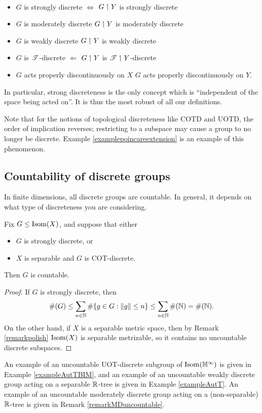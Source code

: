 \begin{observation}~
\label{observationrestrictions}
\begin{itemize}
\item[(i)] $G$ is strongly discrete $\Leftrightarrow$ $G\upharpoonleft Y$ is strongly discrete
\item[(ii)] $G$ is moderately discrete \implies $G\upharpoonleft Y$ is moderately discrete
\item[(iii)] $G$ is weakly discrete \implies $G\upharpoonleft Y$ is weakly discrete
\item[(iv)] $G$ is $\mathscr T$-discrete $\Leftarrow$ $G\upharpoonleft Y$ is $\mathscr T\upharpoonleft Y$-discrete
\item[(v)] $G$ acts properly discontinuously on $X$ \implies $G$ acts properly discontinuously on $Y$.
\end{itemize}
\end{observation}
In particular, strong discreteness is the only concept which is ``independent of the space being acted on''. It is thus the most robust of all our definitions.

Note that for the notions of topological discreteness like COTD and UOTD, the order of implication reverses; restricting to a subspace may cause a group to no longer be discrete. Example \ref{examplepoincareextension} is an example of this phenomenon.

\subsection{Countability of discrete groups}
In finite dimensions, all discrete groups are countable. In general, it depends on what type of discreteness you are considering.

\begin{proposition}
Fix $G\leq\operatorname{Isom}(X)$, and suppose that either
\begin{itemize}
\item[(1)] $G$ is strongly discrete, or
\item[(2)] $X$ is separable and $G$ is COT-discrete.
\end{itemize}
Then $G$ is countable.
\end{proposition}
\begin{proof}
If $G$ is strongly discrete, then
\[
\#(G) \leq \sum_{n\in\N}\#\{g\in G:\dogo g\leq n\} \leq \sum_{n\in\N}\#(\N) = \#(\N).
\]
On the other hand, if $X$ is a separable metric space, then by Remark \ref{remarkpolish} $\operatorname{Isom}(X)$ is separable metrizable, so it contains no uncountable discrete subspaces.
\end{proof}
\begin{remark}
An example of an uncountable UOT-discrete subgroup of $\Isom(\H^\infty)$ is given in Example \ref{exampleAutTBIM}, and an example of an uncountable weakly discrete group acting on a separable $\R$-tree is given in Example \ref{exampleAutT}. An example of an uncountable moderately discrete group acting on a (non-separable) $\R$-tree is given in Remark \ref{remarkMDuncountable}.
\end{remark}

